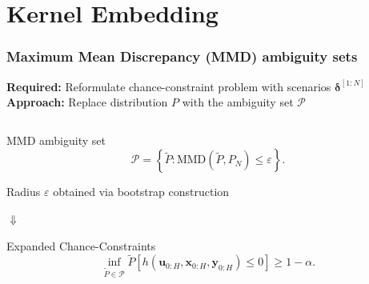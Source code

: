 \documentclass[student, noshadow, itr, english, aspectratio=169]{ITR_LSR_slides}
\begin{document}
\section{Kernel Embedding}

\begin{frame}
	\frametitle{Maximum Mean Discrepancy (MMD) ambiguity sets}
\textbf{Required:} Reformulate chance-constraint problem with scenarios $\boldsymbol{\delta}^{[1:N]}$\\
\textbf{Approach:} Replace distribution $P$ with the ambiguity set $\mathcal{P}$\\

\begin{columns}[onlytextwidth, T]
\begin{column}{.65\textwidth}

\begin{block}{MMD ambiguity set}
\begin{equation*}
\mathcal{P} =  \left\{ \tilde{P} : \text{MMD} (\tilde{P}, P_N) \leq \varepsilon \right\}.
\end{equation*}
\end{block}	

Radius $\varepsilon$ obtained via bootstrap construction 

\makebox[4.2cm]{\hfill} $\boldsymbol{\Downarrow}$ 

\begin{block}{Expanded Chance-Constraints}
\begin{equation*}
\inf\limits_{\tilde{P} \in \mathcal{P}}\tilde{P} \left[ h(\boldsymbol{u}_{0:H},  \boldsymbol{x}_{0:H},  \boldsymbol{y}_{0:H}) \leq 0 \right] \geq 1 - \alpha.
\end{equation*}
\end{block}



\end{column}
\end{columns}
\end{frame}
\end{document}
